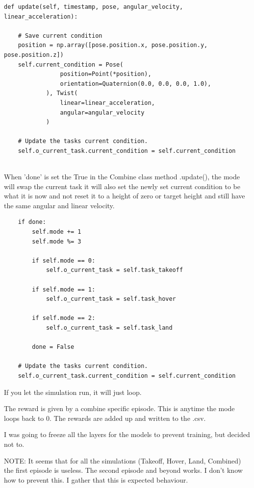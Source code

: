 \documentclass[11pt]{article}
\begin{document}
\begin{verbatim}
def update(self, timestamp, pose, angular_velocity, linear_acceleration):

    # Save current condition
    position = np.array([pose.position.x, pose.position.y, pose.position.z])
    self.current_condition = Pose(
                position=Point(*position),
                orientation=Quaternion(0.0, 0.0, 0.0, 1.0),
            ), Twist(
                linear=linear_acceleration,
                angular=angular_velocity
            )

    # Update the tasks current condition.
    self.o_current_task.current_condition = self.current_condition
    
\end{verbatim}

When 'done' is set the True in the Combine class method .update(), the
mode will swap the current task it will also set the newly set current
condition to be what it is now and not reset it to a height of zero or
target height and still have the same angular and linear velocity.

\begin{verbatim}
    if done:
        self.mode += 1
        self.mode %= 3

        if self.mode == 0:
            self.o_current_task = self.task_takeoff

        if self.mode == 1:
            self.o_current_task = self.task_hover

        if self.mode == 2:
            self.o_current_task = self.task_land

        done = False
        
    # Update the tasks current condition.
    self.o_current_task.current_condition = self.current_condition
\end{verbatim}

If you let the simulation run, it will just loop.

The reward is given by a combine specific episode. This is anytime the
mode loops back to 0. The rewards are added up and written to the .csv.

I was going to freeze all the layers for the models to prevent training,
but decided not to.

NOTE: It seems that for all the simulations (Takeoff, Hover, Land,
Combined) the first episode is useless. The second episode and beyond
works. I don't know how to prevent this. I gather that this is expected
behaviour.
\end{document}
